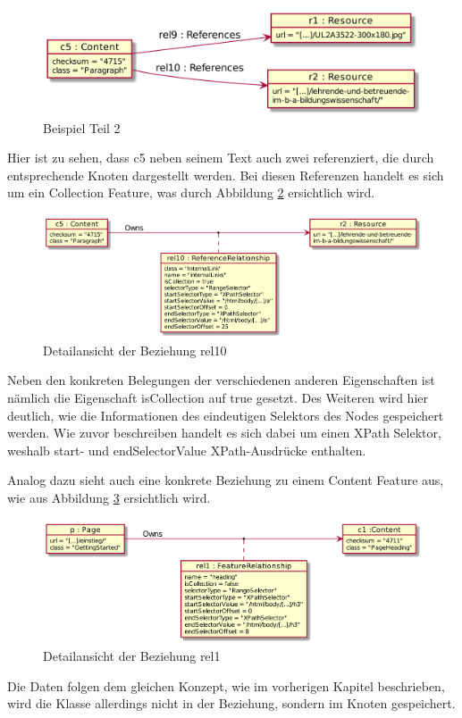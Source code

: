     \begin{figure}[htb]
        \centering
        \includegraphics[width=\textwidth]{../resources/db-data-model/example/example_part2.png}
        \caption{Beispiel Teil 2}
        \label{image:dbDataModelExampleOverviewPart2}
    \end{figure}

    Hier ist zu sehen, dass c5 neben seinem Text auch zwei {\resource} referenziert,
    die durch entsprechende Knoten dargestellt werden.
    Bei diesen Referenzen handelt es sich um ein Collection Feature,
    was durch Abbildung \ref{image:dbDataModelExampleRel10} ersichtlich wird.

    \begin{figure}[htb]
        \centering
        \includegraphics[width=\textwidth]{../resources/db-data-model/example/c5-r2.png}
        \caption{Detailansicht der Beziehung rel10}
        \label{image:dbDataModelExampleRel10}
    \end{figure}

    Neben den konkreten Belegungen der verschiedenen anderen Eigenschaften ist nämlich
    die Eigenschaft isCollection auf true gesetzt.
    Des Weiteren wird hier deutlich, wie die Informationen des eindeutigen Selektors des Nodes gespeichert werden.
    Wie zuvor beschreiben handelt es sich dabei um einen XPath Selektor,
    weshalb start- und endSelectorValue XPath-Ausdrücke enthalten.

    Analog dazu sieht auch eine konkrete Beziehung zu einem Content Feature aus,
    wie aus Abbildung \ref{image:dbDataModelExampleRel1} ersichtlich wird.

    \begin{figure}[htb]
        \centering
        \includegraphics[width=\textwidth]{../resources/db-data-model/example/p-c1.png}
        \caption{Detailansicht der Beziehung rel1}
        \label{image:dbDataModelExampleRel1}
    \end{figure}

    Die Daten folgen dem gleichen Konzept, wie im vorherigen Kapitel beschrieben,
    wird die Klasse allerdings nicht in der Beziehung, sondern im Knoten gespeichert.
